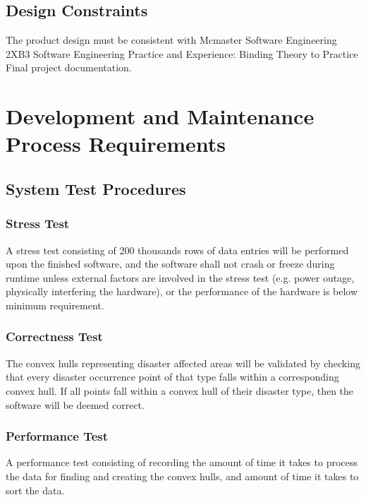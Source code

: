 \documentclass{article}
\begin{document}
    \subsection{Design Constraints}
    The product design must be consistent with Mcmaster Software Engineering 
    2XB3 Software Engineering Practice and Experience: Binding Theory to Practice 
    Final project documentation.
    
    \section{Development and Maintenance Process Requirements}
    \subsection{System Test Procedures}
    \subsubsection{Stress Test}
    A stress test consisting of 200 thousands rows of data entries will be 
    performed upon the finished software, and the software shall not crash 
    or freeze during runtime unless external factors are involved in the 
    stress test (e.g. power outage, physically interfering the hardware),
    or the performance of the hardware is below minimum requirement.

    \subsubsection{Correctness Test}
    The convex hulls representing disaster affected areas will be validated 
    by checking that every disaster occurrence point of that type falls within a 
    corresponding convex hull. If all points fall within a convex hull of their 
    disaster type, then the software will be deemed correct.

    \subsubsection {Performance Test}
    A performance test consisting of recording the amount of time it takes to 
    process the data for finding and creating the convex hulls, and amount of 
    time it takes to sort the data.
\end{document}
